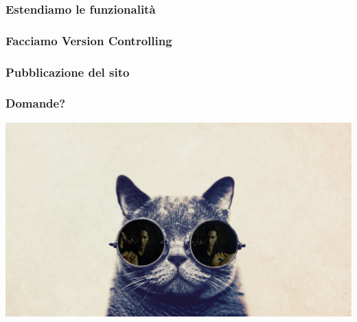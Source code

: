 \begin{frame}
	\frametitle{Estendiamo le funzionalità}
\end{frame}

\begin{frame}
	\frametitle{Facciamo Version Controlling}
\end{frame}

\begin{frame}
	\frametitle{Pubblicazione del sito}
\end{frame}


\begin{frame}
	\frametitle{Domande?}
	\begin{center}
		\includegraphics[scale=0.15]{img/cat-with-glasses}
	\end{center}
\end{frame}


